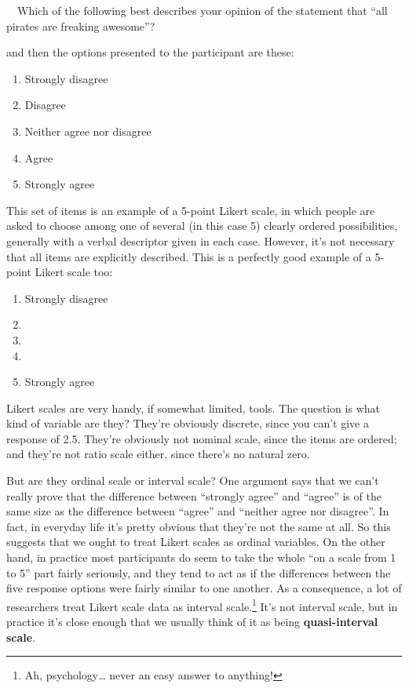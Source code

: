 \documentclass[
  a4paper,
]{book}
\providecommand{\tightlist}{%
  \setlength{\itemsep}{0pt}\setlength{\parskip}{0pt}}\usepackage{longtable,booktabs,array}
\begin{document}
~~Which of the following best describes your opinion of the statement
that ``all pirates are freaking awesome''?

and then the options presented to the participant are these:

\begin{enumerate}
\def\labelenumi{\arabic{enumi}.}
\tightlist
\item
  Strongly disagree
\item
  Disagree
\item
  Neither agree nor disagree
\item
  Agree
\item
  Strongly agree
\end{enumerate}

This set of items is an example of a 5-point Likert scale, in which
people are asked to choose among one of several (in this case 5) clearly
ordered possibilities, generally with a verbal descriptor given in each
case. However, it's not necessary that all items are explicitly
described. This is a perfectly good example of a 5-point Likert scale
too:

\begin{enumerate}
\def\labelenumi{\arabic{enumi}.}
\tightlist
\item
  Strongly disagree
\item
\item
\item
\item
  Strongly agree
\end{enumerate}

Likert scales are very handy, if somewhat limited, tools. The question
is what kind of variable are they? They're obviously discrete, since you
can't give a response of 2.5. They're obviously not nominal scale, since
the items are ordered; and they're not ratio scale either, since there's
no natural zero.

But are they ordinal scale or interval scale? One argument says that we
can't really prove that the difference between ``strongly agree'' and
``agree'' is of the same size as the difference between ``agree'' and
``neither agree nor disagree''. In fact, in everyday life it's pretty
obvious that they're not the same at all. So this suggests that we ought
to treat Likert scales as ordinal variables. On the other hand, in
practice most participants do seem to take the whole ``on a scale from 1
to 5'' part fairly seriously, and they tend to act as if the differences
between the five response options were fairly similar to one another. As
a consequence, a lot of researchers treat Likert scale data as interval
scale.\footnote{Ah, psychology\ldots{} never an easy answer to anything!}
It's not interval scale, but in practice it's close enough that we
usually think of it as being \textbf{quasi-interval scale}.
\end{document}
